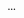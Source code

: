 \begin{changemargin}{-10mm}{-15mm}
\begin{activite}[...]    
\dots
\end{activite}
\end{changemargin}